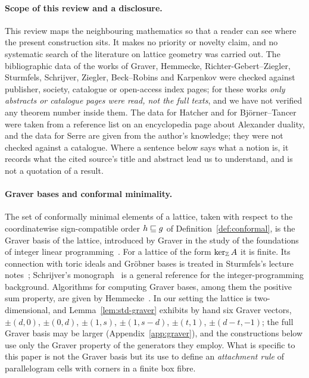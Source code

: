 \paragraph{Scope of this review and a disclosure.}
This review maps the neighbouring mathematics so that a reader can see where the present construction sits. It makes no priority or novelty claim, and no systematic search of the literature on lattice geometry was carried out. The bibliographic data of the works of Graver, Hemmecke, Richter-Gebert--Ziegler, Sturmfels, Schrijver, Ziegler, Beck--Robins and Karpenkov were checked against publisher, society, catalogue or open-access index pages; for these works \emph{only abstracts or catalogue pages were read, not the full texts}, and we have not verified any theorem number inside them. The data for Hatcher and for Bj\"orner--Tancer were taken from a reference list on an encyclopedia page about Alexander duality, and the data for Serre are given from the author's knowledge; they were not checked against a catalogue. Where a sentence below says what a notion is, it records what the cited source's title and abstract lead us to understand, and is not a quotation of a result.

\paragraph{Graver bases and conformal minimality.}
The set of conformally minimal elements of a lattice, taken with respect to the coordinatewise sign-compatible order $h\sqsubseteq g$ of Definition~\ref{def:conformal}, is the Graver basis of the lattice, introduced by Graver in the study of the foundations of integer linear programming~\cite{Graver1975}. For a lattice of the form $\ker_\mathbb Z A$ it is finite. Its connection with toric ideals and Gr\"obner bases is treated in Sturmfels's lecture notes~\cite{Sturmfels1996}; Schrijver's monograph~\cite{Schrijver1986} is a general reference for the integer-programming background. Algorithms for computing Graver bases, among them the positive sum property, are given by Hemmecke~\cite{Hemmecke2003}. In our setting the lattice is two-dimensional, and Lemma~\ref{lem:std-graver} exhibits by hand six Graver vectors, $\pm(d,0)$, $\pm(0,d)$, $\pm(1,s)$, $\pm(1,s-d)$, $\pm(t,1)$, $\pm(d-t,-1)$; the full Graver basis may be larger (Appendix~\ref{app:graver}), and the constructions below use only the Graver property of the generators they employ. What is specific to this paper is not the Graver basis but its use to define an \emph{attachment rule} of parallelogram cells with corners in a finite box fibre.

